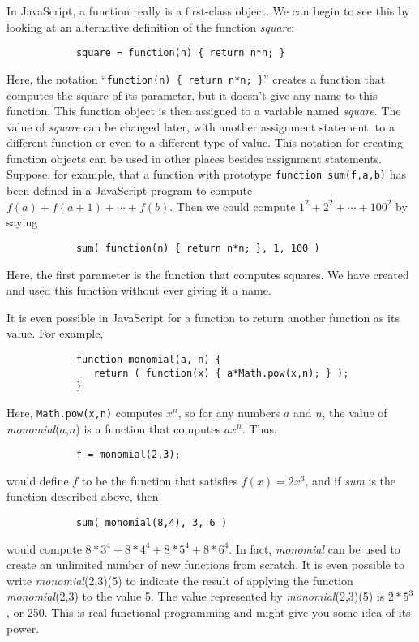 In JavaScript, a function really is a first-class object.  We can 
begin to see this by looking at an alternative definition of the
function \textit{square}:
\begin{verbatim}
            square = function(n) { return n*n; }
\end{verbatim}
Here, the notation ``\verb=function(n) { return n*n; }='' creates
a function that computes the square of its parameter, but it doesn't
give any name to this function.  This function object is then
assigned to a variable named \textit{square}.  The value of
\textit{square} can be changed later, with another assignment
statement, to a different function or even to a different type
of value.  This notation for creating function objects can
be used in other places besides assignment statements.  Suppose,
for example, that a function with prototype
\verb=function sum(f,a,b)= has been defined in a JavaScript
program to compute $f(a)+f(a+1)+\cdots+f(b)$.  Then
we could compute $1^2+2^2+\cdots+100^2$ by saying
\begin{verbatim}
            sum( function(n) { return n*n; }, 1, 100 )
\end{verbatim}
Here, the first parameter is the function that computes
squares.  We have created and used this function
without ever giving it a name.

It is even possible in JavaScript for a function to return
another function as its value.  For example,
\begin{verbatim}
            function monomial(a, n) {
               return ( function(x) { a*Math.pow(x,n); } );
            }
\end{verbatim}
Here, \verb=Math.pow(x,n)= computes $x^n$, so for any
numbers $a$ and $n$, the value of \textit{monomial}($a$,$n$) is 
a function that computes $ax^n$.  Thus,
\begin{verbatim}
            f = monomial(2,3);
\end{verbatim}
would define $f$ to be the function that satisfies $f(x)=2x^3$,
and if \textit{sum} is the function described above, then
\begin{verbatim}
            sum( monomial(8,4), 3, 6 )
\end{verbatim}
would compute $8*3^4+8*4^4+8*5^4+8*6^4$.  In fact, \textit{monomial}
can be used to create an unlimited number of new functions
from scratch.  It is even possible to write \textit{monomial}(2,3)(5)
to indicate the result of applying the function \textit{monomial}(2,3)
to the value 5.  The value represented by \textit{monomial}(2,3)(5)
is $2*5^3$, or 250.  This is real functional programming and
might give you some idea of its power.



